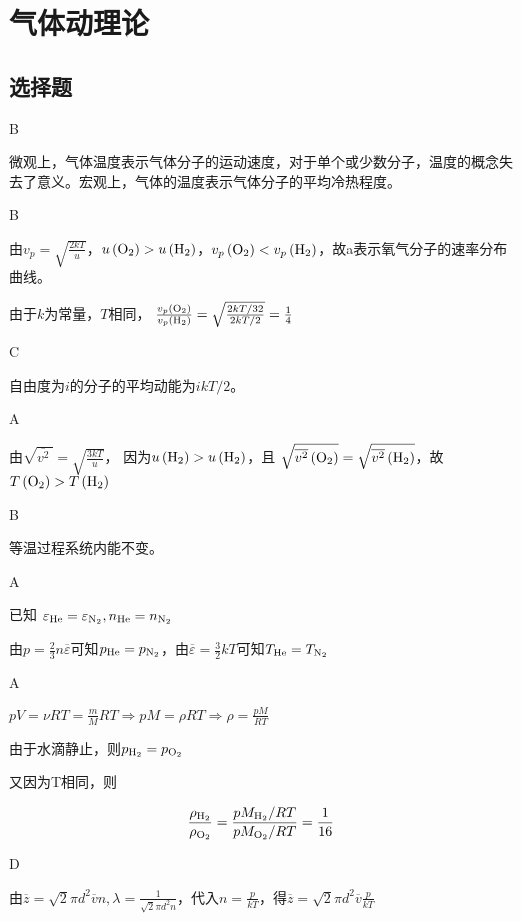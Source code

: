 \chapter{气体动理论}
\section{选择题}
\exercise B

\solve 微观上，气体温度表示气体分子的运动速度，对于单个或少数分子，温度的概念失去了意义。宏观上，气体的温度表示气体分子的平均冷热程度。

\exercise B

\solve
由$v_p=\sqrt{\frac{2kT}{u}}$，$u\left(\ce{O2}\right)>u\left(\ce{H2}\right)$，$v_p\left(\ce{O2}\right)<v_p\left(\ce{H2}\right)$，故a表示氧气分子的速率分布曲线。

由于$k$为常量，$T$相同，
$\frac{v_p\left(\ce{O2}\right)}{v_p\left(\ce{H2}\right)}=\sqrt{\frac{2kT/32}{2kT/2}}=\frac{1}{4}$

\exercise C

\solve 自由度为$i$的分子的平均动能为$ikT/2$。

\exercise A

\solve
由$
\sqrt{\overline{v^2}\ }=\sqrt{\frac{3kT}{u}}$，
因为$u\left(\ce{H2}\right)> u\left(\ce{H2}\right)$，且
$\sqrt {\overline{v^2}\left(\ce{O2}\right)} = \sqrt {\overline{v^2}\left(\ce{H2}\right)}$，故
$T\left(\ce{O2}\right)>T\left(\ce{H2}\right) $

\exercise B

\solve 等温过程系统内能不变。

\exercise A

\solve
已知
$\varepsilon_{\ce{He}}=\varepsilon_{\ce{N2}},n_{\ce{He}}=n_{\ce{N2}}$

由$p=\frac{2}{3}n\overline{\varepsilon}$可知$p_{\ce{He}}=p_{\ce{N2}}$，由$\overline{\varepsilon}=\frac{3}{2}kT$可知$T_{\ce{He}}=T_{\ce{N2}}$

\exercise A

\solve
$p V = \nu R T= \frac { m } { M } R T \Rightarrow p M= \rho R T \Rightarrow \rho= \frac { p M } { R T }$

由于水滴静止，则$p_{\ce{H2}} =p_{\ce{O2}}$

又因为T相同，则

$$
\frac {\rho_{\ce{H2}} } {\rho_{\ce{O2}} } = \frac{pM_{\ce{H2}}/RT} {pM_{\ce{O2}}/RT}=\frac{1}{16}
$$

\exercise D

\solve
由$
 \overline { z } = \sqrt { 2 } \pi d ^ 2 \overline { v } n,\lambda = \frac { 1 } { \sqrt { 2 } \pi d ^ { 2 } n } $，代入$n = \frac { p } { k T }$，得$\overline{ z } = \sqrt { 2 } \pi d ^ { 2 } \overline { v } \frac { p } { k T }$

